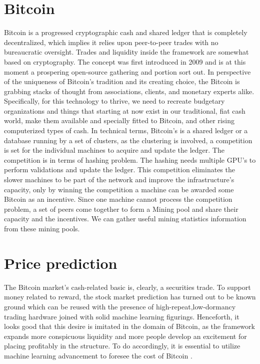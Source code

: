 \documentclass[sigconf]{acmart}
\begin{document}
\section{Bitcoin}
Bitcoin is a progressed cryptographic cash and shared ledger that is completely decentralized, which implies it relies upon peer-to-peer trades with no bureaucratic oversight. Trades and liquidity inside the framework are somewhat based on cryptography. The concept was first introduced in 2009  \cite{Bitcoin} and is at this moment a prospering open-source gathering and portion sort out. In perspective of the uniqueness of Bitcoin's tradition and its creating choice, the Bitcoin is grabbing stacks of thought from associations, clients, and monetary experts alike. Specifically, for this technology to thrive, we need to recreate budgetary organizations and things that starting at now exist in our traditional, fiat cash world, make them available and specially fitted to Bitcoin, and other rising computerized types of cash.
In technical terms, Bitcoin's is a shared ledger or a database running by a set of clusters, as the clustering is involved, a competition is set for the individual machines to acquire and update the ledger. The competition is in terms of hashing problem. The hashing needs multiple GPU's to perform validations and update the ledger. This competition eliminates the slower machines to be part of the network and improve the infrastructure's capacity, only by winning the competition a machine can be awarded some Bitcoin as an incentive. Since one machine cannot process the competition problem, a set of peers come together to form a Mining pool and share their capacity and the incentives. We can gather useful mining statistics information from these mining pools.
 
 \section{Price prediction}
 The Bitcoin market's cash-related basic is, clearly, a securities trade. To support money related to reward, the stock market prediction has turned out to be known ground which can be reused with the presence of high-repeat,low-dormancy trading hardware joined with solid machine learning figurings. Henceforth, it looks good that this desire is imitated in the domain of Bitcoin, as the framework expands more conspicuous liquidity and more people develop an excitement for placing profitably in the structure. To do accordingly, it is essential to utilize machine learning advancement to foresee the cost of Bitcoin \cite{stock}.
 
\end{document}
